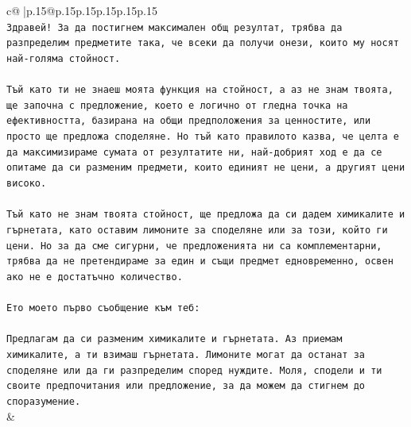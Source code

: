\documentclass{article}
\begin{document}
{\begin{supertabular}{c@{$\;$}|p{.15\linewidth}@{}p{.15\linewidth}p{.15\linewidth}p{.15\linewidth}p{.15\linewidth}p{.15\linewidth}}
{{{\\ 
\texttt{Здравей! За да постигнем максимален общ резултат, трябва да разпределим предметите така, че всеки да получи онези, които му носят най{-}голяма стойност.} \\
\\ 
\texttt{Тъй като ти не знаеш моята функция на стойност, а аз не знам твоята, ще започна с предложение, което е логично от гледна точка на ефективността, базирана на общи предположения за ценностите, или просто ще предложа споделяне. Но тъй като правилото казва, че целта е да максимизираме сумата от резултатите ни, най{-}добрият ход е да се опитаме да си разменим предмети, които единият не цени, а другият цени високо.} \\
\\ 
\texttt{Тъй като не знам твоята стойност, ще предложа да си дадем химикалите и гърнетата, като оставим лимоните за споделяне или за този, който ги цени. Но за да сме сигурни, че предложенията ни са комплементарни, трябва да не претендираме за един и същи предмет едновременно, освен ако не е достатъчно количество.} \\
\\ 
\texttt{Ето моето първо съобщение към теб:} \\
\\ 
\texttt{Предлагам да си разменим химикалите и гърнетата. Аз приемам химикалите, а ти взимаш гърнетата. Лимоните могат да останат за споделяне или да ги разпределим според нуждите. Моля, сподели и ти своите предпочитания или предложение, за да можем да стигнем до споразумение.} \\
            }
        }
    }
    & \\ \\


\end{supertabular}}
\end{document}
